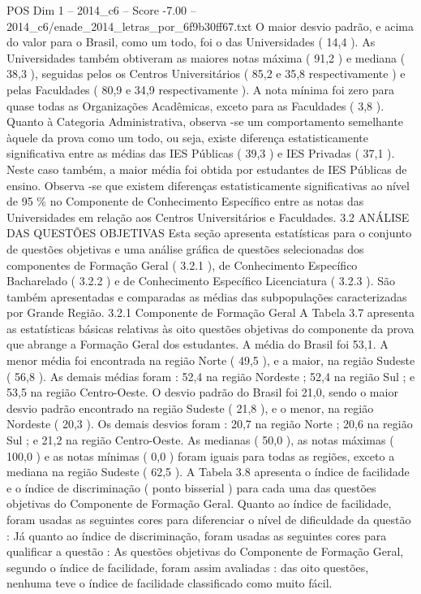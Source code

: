 \begin{textsample}{POS Dim 1 – 2014\_c6 – Score -7.00 – 2014\_c6/enade\_2014\_letras\_por\_6f9b30ff67.txt}
O maior desvio padrão, e acima do valor para o Brasil, como um todo, foi o das Universidades ( 14,4 ).
As Universidades também obtiveram as maiores notas máxima ( 91,2 ) e mediana ( 38,3 ), seguidas pelos os Centros Universitários ( 85,2 e 35,8 respectivamente ) e pelas Faculdades ( 80,9 e 34,9 respectivamente ).
A nota mínima foi zero para quase todas as Organizações Acadêmicas, exceto para as Faculdades ( 3,8 ).
Quanto à Categoria Administrativa, observa -se um comportamento semelhante àquele da prova como um todo, ou seja, existe diferença estatisticamente significativa entre as médias das IES Públicas ( 39,3 ) e IES Privadas ( 37,1 ).
Neste caso também, a maior média foi obtida por estudantes de IES Públicas de ensino.
Observa -se que existem diferenças estatisticamente significativas ao nível de 95 \% no Componente de Conhecimento Específico entre as notas das Universidades em relação aos Centros Universitários e Faculdades. 3.2 ANÁLISE DAS QUESTÕES OBJETIVAS Esta seção apresenta estatísticas para o conjunto de questões objetivas e uma análise gráfica de questões selecionadas dos componentes de Formação Geral ( 3.2.1 ), de Conhecimento Específico Bacharelado ( 3.2.2 ) e de Conhecimento Específico Licenciatura ( 3.2.3 ).
São também apresentadas e comparadas as médias das subpopulações caracterizadas por Grande Região. 3.2.1 Componente de Formação Geral A Tabela 3.7 apresenta as estatísticas básicas relativas às oito questões objetivas do componente da prova que abrange a Formação Geral dos estudantes.
A média do Brasil foi 53,1.
A menor média foi encontrada na região Norte ( 49,5 ), e a maior, na região Sudeste ( 56,8 ).
As demais médias foram : 52,4 na região Nordeste ; 52,4 na região Sul ; e 53,5 na região Centro-Oeste.
O desvio padrão do Brasil foi 21,0, sendo o maior desvio padrão encontrado na região Sudeste ( 21,8 ), e o menor, na região Nordeste ( 20,3 ).
Os demais desvios foram : 20,7 na região Norte ; 20,6 na região Sul ; e 21,2 na região Centro-Oeste.
As medianas ( 50,0 ), as notas máximas ( 100,0 ) e as notas mínimas ( 0,0 ) foram iguais para todas as regiões, exceto a mediana na região Sudeste ( 62,5 ).
A Tabela 3.8 apresenta o índice de facilidade e o índice de discriminação ( ponto bisserial ) para cada uma das questões objetivas do Componente de Formação Geral.
Quanto ao índice de facilidade, foram usadas as seguintes cores para diferenciar o nível de dificuldade da questão : Já quanto ao índice de discriminação, foram usadas as seguintes cores para qualificar a questão : As questões objetivas do Componente de Formação Geral, segundo o índice de facilidade, foram assim avaliadas : das oito questões, nenhuma teve o índice de facilidade classificado como muito fácil.

\end{textsample}
